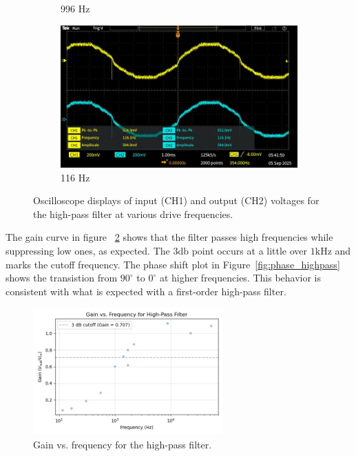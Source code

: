 \documentclass{article}
\begin{document}
\begin{figure}[H]
\begin{subfigure}[b]{0.45\textwidth}
        \caption{996 Hz}
    \end{subfigure}
    \hfill
    \begin{subfigure}[b]{0.45\textwidth}
        \includegraphics[width=\textwidth]{2.2.cd.png}
        \caption{116 Hz}
    \end{subfigure}
    \caption{Oscilloscope displays of input (CH1) and output (CH2) voltages for the high-pass filter at various drive frequencies.}
    \label{fig:high_pass_scope}
\end{figure}

\noindent The gain curve in figure ~\ref{fig:gain_highpass} shows that the
filter passes high frequencies while suppressing low ones, as expected. The $3\si{\decibel}$
point occurs at a little over $1\si{\kilo\hertz}$ and marks the cutoff frequency. The 
phase shift plot in Figure~\ref{fig:phase_highpass} shows the transistion from $90^\circ$
to $0^\circ$ at higher frequencies. This behavior is consistent with what
is expected with a first-order high-pass filter.

\begin{figure}[H]
    \centering
    \includegraphics[width=0.65\textwidth]{2.2.cgain.png}
    \caption{Gain vs. frequency for the high-pass filter.}
    \label{fig:gain_highpass}
\end{figure}
\end{document}
